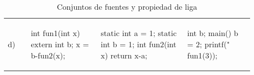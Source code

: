 \begin{table}
\begin{tabular}{p{0.2cm}|p{3cm}|p{3.5cm}|p{3.5cm}|p{3cm}}
d)
&
\begin{codecell}

\end{codecell}
&
\begin{codecell}
int fun1(int x)
{
	extern int b;
	x = b-fun2(x);
}
\end{codecell}
&
\begin{codecell}
static int 
	a = 1;
static int 
	b = 1;
int fun2(int x) 
{
	return x-a;
}
\end{codecell}
&
\begin{codecell}
int b;
main()
{
	b = 2;
	printf("%
		fun1(3));
}
\end{codecell}\\

\end{tabular}
\caption{Conjuntos de fuentes y propiedad de liga}
\label{tab:fuentes}
\end{table}

